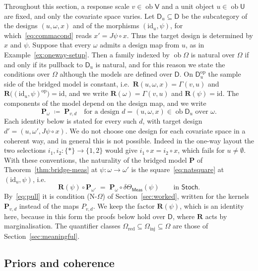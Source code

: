 \documentclass[11pt,a4paper]{article}
\theoremstyle{plain}
\theoremstyle{definition}
\theoremstyle{remark}
\newcommand{\cat}[1]{\mathsf{#1}}
\newcommand{\catU}{\cat{U}}
\newcommand{\catV}{\cat{V}}
\newcommand{\catO}{\cat{\Omega}}
\newcommand{\catD}{\cat{D}}
\newcommand{\Meas}{\cat{Meas}}
\newcommand{\Stoch}{\cat{Stoch}}
\newcommand{\op}{\mathrm{op}}
\newcommand{\id}{\mathrm{id}}
\newcommand{\del}{\delta}
\DeclareMathOperator{\ob}{ob}
\begin{document}
Throughout this section, a response scale $v \in \ob\catV$ and a unit object
$u \in \ob\catU$ are fixed, and only the covariate space varies. Let
$\catD_{u} \subseteq \catD$ be the subcategory of the designs $(u,\omega,x)$
and of the morphisms $(\id_{u},\psi)$, for which~\eqref{eq:commacond} reads
$x' = J\psi \circ x$. Thus the target design is determined by $x$ and $\psi$.
Suppose that every $\omega$ admits a design map from $u$, as in
Example~\ref{ex:oneway-setup}. Then a family indexed by $\ob\catO$ is natural
over $\catO$ if and only if its pullback to $\catD_{u}$ is natural, and for
this reason we state the conditions over $\catO$ although the models are
defined over $\catD$. On $\catD_{u}^{\op}$ the sample side of the bridged model
is constant, i.e.\ $\mathbf{R}(u,\omega,x) = \Gamma(v,u)$ and
$\mathbf{R}\bigl((\id_{u},\psi)^{\op}\bigr) = \id$, and we write
$\mathbf{R}(\omega) = \Gamma(v,u)$ and $\mathbf{R}(\psi) = \id$. The components
of the model depend on the design map, and we write
\[
\mathbf P_{\omega} \;\coloneqq\; \mathbf P_{v,d}
\quad\text{for a design } d = (u,\omega,x) \in \ob\catD_{u} \text{ over }
\omega.
\]
Each identity below is stated for every such $d$, with target design
$d' = (u,\omega',J\psi \circ x)$. We do not choose one design for each
covariate space in a coherent way, and in general this is not possible. Indeed
in the one-way layout the two selections
$i_{1},i_{2} \colon \{*\} \to \{1,2\}$ would give $i_{1} \circ x = i_{2} \circ x$,
which fails for $u \neq \emptyset$. With these conventions, the naturality of
the bridged model $\mathbf P$ of Theorem~\ref{thm:bridge-meas} at
$\psi \colon \omega \to \omega'$ is the square~\eqref{eq:natsquare} at
$(\id_{u},\psi)$, i.e.
\begin{equation}\label{eq:natfibre}
\mathbf{R}(\psi) \circ \mathbf P_{\omega'}
\;=\; \mathbf P_{\omega} \circ \del\Theta_\Meas(\psi)
\qquad\text{in } \Stoch .
\end{equation}
By~\eqref{eq:pull} it is condition (N-$\catO$) of Section~\ref{sec:worked},
written for the kernels $\mathbf P_{v,d}$ instead of the maps $P_{v,d}$. We
keep the factor $\mathbf{R}(\psi)$, which is an identity here, because in this
form the proofs below hold over $\catD$, where $\mathbf{R}$ acts by
marginalisation. The quantifier classes
$\catO_{\mathrm{red}} \subseteq \catO_{\mathrm{inj}} \subseteq \catO$ are those
of Section~\ref{sec:meaningful}.

\subsection{Priors and coherence}
\end{document}
